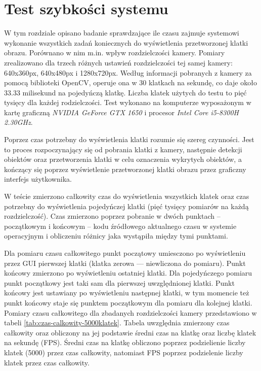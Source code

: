 \chapter{Test szybkości systemu}
\label{chap:test-szybkosci}
W tym rozdziale opisano badanie sprawdzające ile czasu zajmuje systemowi wykonanie wszystkich zadań koniecznych do wyświetlenia przetworzonej klatki obrazu. Porównano w nim m.in. wpływ rozdzielczości kamery. Pomiary zrealizowano dla trzech różnych ustawień rozdzielczości tej samej kamery: 640x360px, 640x480px i 1280x720px.
Według informacji pobranych z kamery za pomocą biblioteki OpenCV, operuje ona w 30 klatkach na sekundę, co daje około 33.33 milisekund na pojedyńczą klatkę. Liczba klatek użytych do testu to pięć tysięcy dla każdej rodzielczości.
Test wykonano na komputerze wyposażonym w kartę graficzną \emph{NVIDIA GeForce GTX 1650} i procesor \emph{Intel Core i5-8300H 2.30GHz}.

Poprzez czas potrzebny do wyświetlenia klatki rozumie się szereg czynności. Jest to proces rozpoczynający się od pobrania klatki z kamery, następnie detekcji obiektów oraz przetworzenia klatki w celu oznaczenia wykrytych obiektów, a kończący się poprzez wyświetlenie przetworzonej klatki obrazu przez graficzny interfejs użytkownika. 

W teście zmierzono całkowity czas do wyświetlenia wszystkich klatek oraz czas potrzebny do wyświetlenia pojedyńczej klatki (pięć tysięcy pomiarów na każdą rozdzielczość). Czas zmierzono poprzez pobranie w dwóch punktach -- początkowym i końcowym -- kodu źródłowego aktualnego czasu w systemie operacyjnym i obliczeniu różnicy jaka wystąpiła między tymi punktami. 

Dla pomiaru czasu całkowitego punkt początowy umiesczono po wyświetleniu przez GUI pierwszej klatki (klatka zerowa --- niewliczona do pomiaru). Punkt końcowy zmierzono po wyświetleniu ostatniej klatki.
Dla pojedyńczego pomiaru punkt początkowy jest taki sam dla pierwszej uwzględnionej klatki. Punkt końcowy jest ustawiany po wyświetleniu następnej klatki, w tym momencie też punkt końcowy staje się punktem początkowym dla pomiaru dla kolejnej klatki.
Pomiary czasu całkowitego dla zbadanych rozdzielczości kamery przedstawiono w tabeli \ref{tab:czas-calkowity-5000klatek}. Tabela uwzględnia zmierzony czas całkowity oraz obliczony na jej podstawie średni czas na klatkę oraz liczbę klatek na sekundę (FPS). Średni czas na klatkę obliczono poprzez podzielienie liczby klatek (5000) przez czas całkowity, natomiast FPS poprzez podzielenie liczby klatek przez czas całkowity.  


